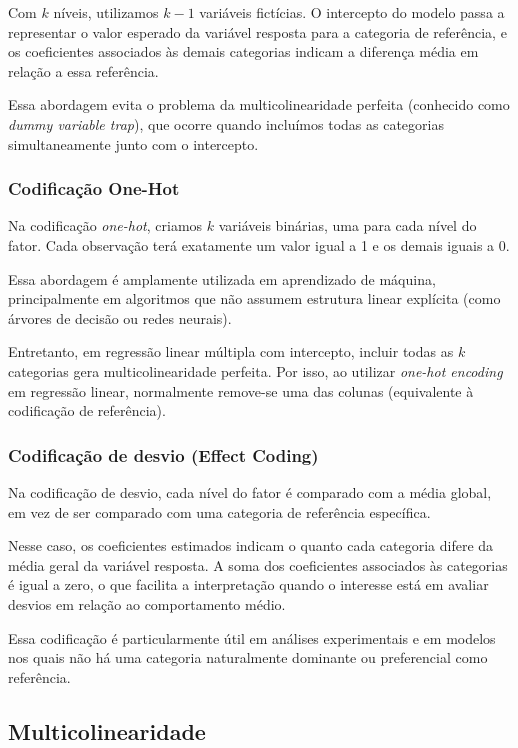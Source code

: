 \documentclass{article}
\begin{document}
Com $k$ níveis, utilizamos $k - 1$ variáveis fictícias. O intercepto do modelo
passa a representar o valor esperado da variável resposta para a categoria
de referência, e os coeficientes associados às demais categorias indicam
a diferença média em relação a essa referência.

Essa abordagem evita o problema da multicolinearidade perfeita
(conhecido como \textit{dummy variable trap}), que ocorre quando incluímos
todas as categorias simultaneamente junto com o intercepto.

\subsubsection{Codificação One-Hot}

Na codificação \textit{one-hot}, criamos $k$ variáveis binárias, uma para cada
nível do fator. Cada observação terá exatamente um valor igual a 1 e os demais
iguais a 0.

Essa abordagem é amplamente utilizada em aprendizado de máquina,
principalmente em algoritmos que não assumem estrutura linear explícita
(como árvores de decisão ou redes neurais).

Entretanto, em regressão linear múltipla com intercepto, incluir todas
as $k$ categorias gera multicolinearidade perfeita. Por isso, ao utilizar
\textit{one-hot encoding} em regressão linear, normalmente remove-se uma
das colunas (equivalente à codificação de referência).

\subsubsection{Codificação de desvio (Effect Coding)}

Na codificação de desvio, cada nível do fator é comparado com a média global,
em vez de ser comparado com uma categoria de referência específica.

Nesse caso, os coeficientes estimados indicam o quanto cada categoria
difere da média geral da variável resposta. A soma dos coeficientes
associados às categorias é igual a zero, o que facilita a interpretação
quando o interesse está em avaliar desvios em relação ao comportamento médio.

Essa codificação é particularmente útil em análises experimentais
e em modelos nos quais não há uma categoria naturalmente dominante
ou preferencial como referência.

\subsection{Multicolinearidade}
\end{document}
